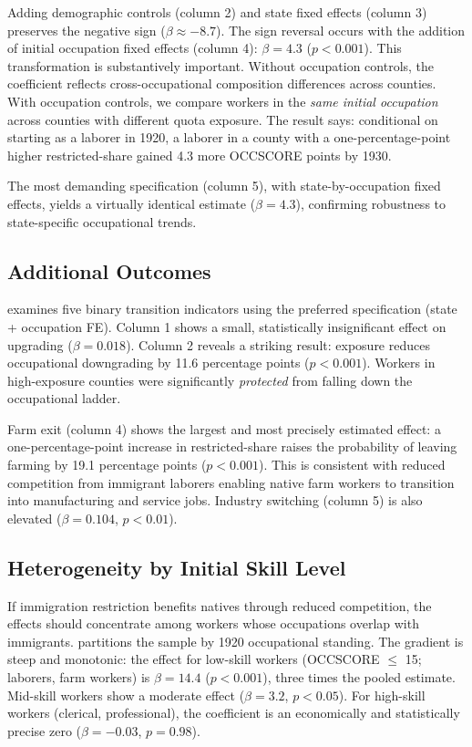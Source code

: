 \documentclass[12pt]{article}
\begin{document}
Adding demographic controls (column 2) and state fixed effects (column 3) preserves the negative sign ($\beta \approx -8.7$). The sign reversal occurs with the addition of initial occupation fixed effects (column 4): $\beta = 4.3$ ($p < 0.001$). This transformation is substantively important. Without occupation controls, the coefficient reflects cross-occupational composition differences across counties. With occupation controls, we compare workers in the \emph{same initial occupation} across counties with different quota exposure. The result says: conditional on starting as a laborer in 1920, a laborer in a county with a one-percentage-point higher restricted-share gained 4.3 more OCCSCORE points by 1930.

The most demanding specification (column 5), with state-by-occupation fixed effects, yields a virtually identical estimate ($\beta = 4.3$), confirming robustness to state-specific occupational trends.



\subsection{Additional Outcomes}

 examines five binary transition indicators using the preferred specification (state + occupation FE). Column 1 shows a small, statistically insignificant effect on upgrading ($\beta = 0.018$). Column 2 reveals a striking result: exposure reduces occupational downgrading by 11.6 percentage points ($p < 0.001$). Workers in high-exposure counties were significantly \emph{protected} from falling down the occupational ladder.

Farm exit (column 4) shows the largest and most precisely estimated effect: a one-percentage-point increase in restricted-share raises the probability of leaving farming by 19.1 percentage points ($p < 0.001$). This is consistent with reduced competition from immigrant laborers enabling native farm workers to transition into manufacturing and service jobs. Industry switching (column 5) is also elevated ($\beta = 0.104$, $p < 0.01$).



\subsection{Heterogeneity by Initial Skill Level}

If immigration restriction benefits natives through reduced competition, the effects should concentrate among workers whose occupations overlap with immigrants.  partitions the sample by 1920 occupational standing. The gradient is steep and monotonic: the effect for low-skill workers (OCCSCORE $\leq$ 15; laborers, farm workers) is $\beta = 14.4$ ($p < 0.001$), three times the pooled estimate. Mid-skill workers show a moderate effect ($\beta = 3.2$, $p < 0.05$). For high-skill workers (clerical, professional), the coefficient is an economically and statistically precise zero ($\beta = -0.03$, $p = 0.98$).
\end{document}
